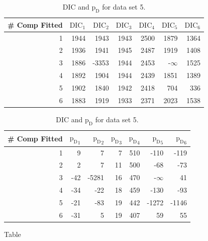 \begin{table}[!htb]
\centering
\caption{DIC and $\text{p}_\text{D}$ for data set 5.}
\label{table : ds_3fused_3ppg_dic}
\begin{tabular}{@{}rrrrrrr@{}}
\toprule
\# Comp Fitted & $\text{DIC}_1$ & $\text{DIC}_2$  & $\text{DIC}_3$  & $\text{DIC}_4$  & $\text{DIC}_5$  & $\text{DIC}_6$  \\ \midrule
1 & 1944 & 1943 & 1943 & 2500 & 1879 & 1364 \\
2 & 1936 & 1941 & 1945 & 2487 & 1919 & 1408 \\
3 & 1886 & -3353 & 1944 & 2453 & -$\infty$ & 1525 \\
4 & 1892 & 1904 & 1944 & 2439 & 1851 & 1389 \\
5 & 1902 & 1840 & 1942 & 2418 & 704 & 336 \\
6 & 1883 & 1919 & 1933 & 2371 & 2023 & 1538 \\ \bottomrule
\end{tabular}

\begin{tabular}{@{}rrrrrrr@{}}
\toprule
\# Comp Fitted & ${\text{p}_\text{D}}_1$ & ${\text{p}_\text{D}}_2$ & ${\text{p}_\text{D}}_3$ & ${\text{p}_\text{D}}_4$ & ${\text{p}_\text{D}}_5$ & ${\text{p}_\text{D}}_6$ \\ \midrule
1 & 9 & 7 & 7 & 510 & -110 & -119 \\
2 & 2 & 7 & 11 & 500 & -68 & -73 \\
3 & -42 & -5281 & 16 & 470 & -$\infty$ & 41 \\
4 & -34 & -22 & 18 & 459 & -130 & -93 \\
5 & -21 & -83 & 19 & 442 & -1272 & -1146 \\
6 & -31 & 5 & 19 & 407 & 59 & 55 \\ \bottomrule
\end{tabular}
\end{table}

Table 

